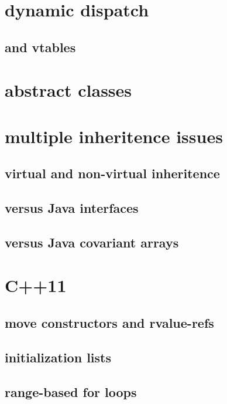 \section{dynamic dispatch}

\subsection{and vtables}

\section{abstract classes}

\section{multiple inheritence issues}

\subsection{virtual and non-virtual inheritence}

\subsection{versus Java interfaces}

\subsection{versus Java covariant arrays}

\section{C++11}

\subsection{move constructors and rvalue-refs}

\subsection{initialization lists}

\subsection{range-based for loops}


